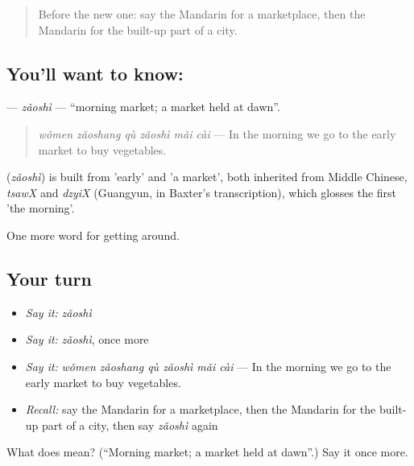 \label{lesson:ZH-C448-zaoshi}



\begin{quote}
Before the new one: say the Mandarin for a marketplace, then the Mandarin for the built-up part of a city.
\end{quote}

\subsection*{You'll want to know: }
\textbf{} — \emph{zǎoshì} — \textquotedblleft{}morning market; a market held at dawn\textquotedblright{}.

\begin{quote}
\textbf{} \emph{wǒmen zǎoshang qù zǎoshì mǎi cài} — In the morning we go to the early market to buy vegetables.
\end{quote}

\begin{cousinweb}
\textbf{} (\emph{zǎoshì}) is built from  'early' and  'a market', both inherited from Middle Chinese, \emph{tsawX} and \emph{dzyiX} (Guangyun, in Baxter's transcription), which glosses the first 'the morning'.
\end{cousinweb}

\begin{grammarlens}[title={What you've built}]
One more word for getting around.
\end{grammarlens}

\subsection*{Your turn}
\begin{itemize}
\raggedright
  \item \emph{Say it:} \emph{zǎoshì}
  \item \emph{Say it:} \emph{zǎoshì}, once more
  \item \emph{Say it:} \emph{wǒmen zǎoshang qù zǎoshì mǎi cài} — In the morning we go to the early market to buy vegetables.
  \item \emph{Recall:} say the Mandarin for a marketplace, then the Mandarin for the built-up part of a city, then say \emph{zǎoshì} again
\end{itemize}

\begin{tcolorbox}[breakable,colback=teal!4,colframe=teal!35!black,title={Before you move on}]
What does  mean? (\textquotedblleft{}Morning market; a market held at dawn\textquotedblright{}.) Say it once more.
\end{tcolorbox}
